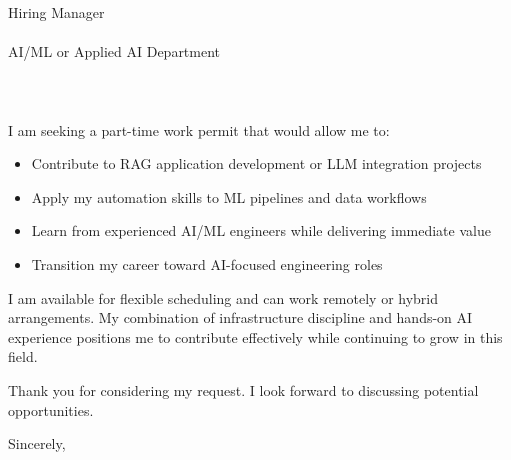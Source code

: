 \documentclass[11pt,a4paper]{letter}
\begin{document}
\begin{letter}{
    Hiring Manager\\\\
    AI/ML or Applied AI Department\\\\
    [Company Name]\\\\
    [Company Address]
}
I am seeking a part-time work permit that would allow me to:
\begin{itemize}
    \item Contribute to RAG application development or LLM integration projects
    \item Apply my automation skills to ML pipelines and data workflows
    \item Learn from experienced AI/ML engineers while delivering immediate value
    \item Transition my career toward AI-focused engineering roles
\end{itemize}

I am available for flexible scheduling and can work remotely or hybrid arrangements. My combination of infrastructure discipline and hands-on AI experience positions me to contribute effectively while continuing to grow in this field.

Thank you for considering my request. I look forward to discussing potential opportunities.

\closing{Sincerely,}

\end{letter}
\end{document}
